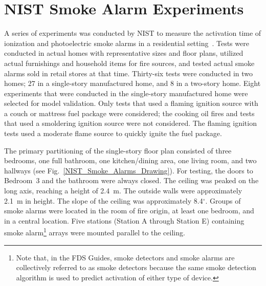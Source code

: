 \section{NIST Smoke Alarm Experiments}

A series of experiments was conducted by NIST to measure the activation time of ionization and photoelectric smoke alarms in a residential setting~\cite{Bukowski:1}. Tests were conducted in actual homes with representative sizes and floor plans, utilized actual furnishings and household items for fire sources, and tested actual smoke alarms sold in retail stores at that time. Thirty-six tests were conducted in two homes; 27 in a single-story manufactured home, and 8 in a two-story home. Eight experiments that were conducted in the single-story manufactured home were selected for model validation. Only tests that used a flaming ignition source with a couch or mattress fuel package were considered; the cooking oil fires and tests that used a smoldering ignition source were not considered. The flaming ignition tests used a moderate flame source to quickly ignite the fuel package.

The primary partitioning of the single-story floor plan consisted of three bedrooms, one full bathroom, one kitchen/dining area, one living room, and two hallways (see Fig.~\ref{NIST_Smoke_Alarms_Drawing}). For testing, the doors to Bedroom~3 and the bathroom were always closed. The ceiling was peaked on the long axis, reaching a height of 2.4~m. The outside walls were approximately 2.1~m in height. The slope of the ceiling was approximately 8.4$^\circ$. Groups of smoke alarms were located in the room of fire origin, at least one bedroom, and in a central location. Five stations (Station A through Station E) containing smoke alarm\footnote{Note that, in the FDS Guides, smoke detectors and smoke alarms are collectively referred to as smoke detectors because the same smoke detection algorithm is used to predict activation of either type of device.} arrays were mounted parallel to the ceiling.

